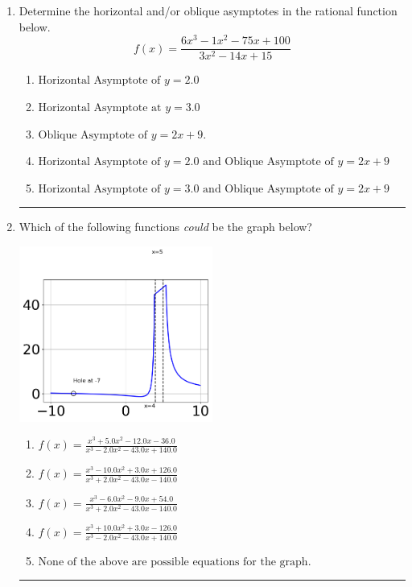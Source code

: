 \documentclass[14pt]{extbook}
\newcommand{\litem}[1]{\item#1\hspace*{-1cm}\rule{\textwidth}{0.4pt}}
\begin{document}
\begin{enumerate}
\litem{
Determine the horizontal and/or oblique asymptotes in the rational function below.\[ f(x) = \frac{6x^{3} -1 x^{2} -75 x + 100}{3x^{2} -14 x + 15} \]\begin{enumerate}[label=\Alph*.]
\item \( \text{Horizontal Asymptote of } y = 2.0  \)
\item \( \text{Horizontal Asymptote at } y = 3.0 \)
\item \( \text{Oblique Asymptote of } y = 2x + 9. \)
\item \( \text{Horizontal Asymptote of } y = 2.0 \text{ and Oblique Asymptote of } y = 2x + 9 \)
\item \( \text{Horizontal Asymptote of } y = 3.0 \text{ and Oblique Asymptote of } y = 2x + 9 \)

\end{enumerate} }
\litem{
Which of the following functions \textit{could} be the graph below?
\begin{center}
    \includegraphics[width=0.5\textwidth]{../Figures/identifyGraphOfRationalFunctionCopyC.png}
\end{center}
\begin{enumerate}[label=\Alph*.]
\item \( f(x)=\frac{x^{3} +5.0 x^{2} -12.0 x -36.0}{x^{3} -2.0 x^{2} -43.0 x + 140.0} \)
\item \( f(x)=\frac{x^{3} -10.0 x^{2} +3.0 x + 126.0}{x^{3} +2.0 x^{2} -43.0 x -140.0} \)
\item \( f(x)=\frac{x^{3} -6.0 x^{2} -9.0 x + 54.0}{x^{3} +2.0 x^{2} -43.0 x -140.0} \)
\item \( f(x)=\frac{x^{3} +10.0 x^{2} +3.0 x -126.0}{x^{3} -2.0 x^{2} -43.0 x + 140.0} \)
\item \( \text{None of the above are possible equations for the graph.} \)


\end{enumerate}}
\end{enumerate}
\end{document}
